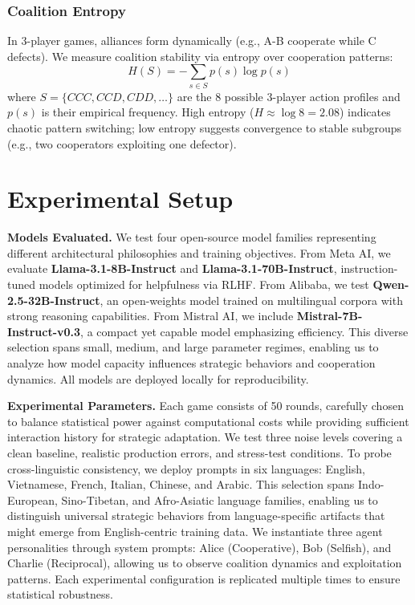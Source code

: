 \documentclass{uai2026} %
\begin{document}
\subsubsection{Coalition Entropy}

In 3-player games, alliances form dynamically (e.g., A-B cooperate while C defects). We measure coalition stability via entropy over cooperation patterns:
\begin{equation}
    H(S) = - \sum_{s \in S} p(s) \log p(s)
\end{equation}
where $S = \{CCC, CCD, CDD, \ldots\}$ are the 8 possible 3-player action profiles and $p(s)$ is their empirical frequency. High entropy ($H \approx \log 8 = 2.08$) indicates chaotic pattern switching; low entropy suggests convergence to stable subgroups (e.g., two cooperators exploiting one defector).

\section{Experimental Setup}\label{sec:experimental}

\textbf{Models Evaluated.} We test four open-source model families representing different architectural philosophies and training objectives. From Meta AI, we evaluate \textbf{Llama-3.1-8B-Instruct} and \textbf{Llama-3.1-70B-Instruct}, instruction-tuned models optimized for helpfulness via RLHF. From Alibaba, we test \textbf{Qwen-2.5-32B-Instruct}, an open-weights model trained on multilingual corpora with strong reasoning capabilities. From Mistral AI, we include \textbf{Mistral-7B-Instruct-v0.3}, a compact yet capable model emphasizing efficiency. This diverse selection spans small, medium, and large parameter regimes, enabling us to analyze how model capacity influences strategic behaviors and cooperation dynamics. All models are deployed locally for reproducibility.

\textbf{Experimental Parameters.} Each game consists of 50 rounds, carefully chosen to balance statistical power against computational costs while providing sufficient interaction history for strategic adaptation. We test three noise levels covering a clean baseline, realistic production errors, and stress-test conditions. To probe cross-linguistic consistency, we deploy prompts in six languages: English, Vietnamese, French, Italian, Chinese, and Arabic. This selection spans Indo-European, Sino-Tibetan, and Afro-Asiatic language families, enabling us to distinguish universal strategic behaviors from language-specific artifacts that might emerge from English-centric training data. We instantiate three agent personalities through system prompts: Alice (Cooperative), Bob (Selfish), and Charlie (Reciprocal), allowing us to observe coalition dynamics and exploitation patterns. Each experimental configuration is replicated multiple times to ensure statistical robustness.
\end{document}
